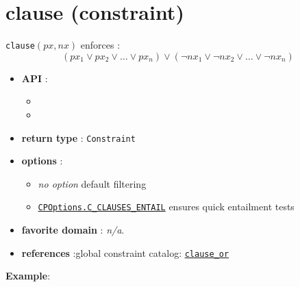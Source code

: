 \label{clause}
\hypertarget{clause}{}

\section{clause (constraint)}\label{clause:clauseconstraint}\hypertarget{clause:clauseconstraint}{}
\begin{notedef}
  \texttt{clause}$(px, nx)$ enforces :
 $$(px_1 \vee px_2 \vee \dots \vee px_n) \vee (\neg nx_1 \vee \neg nx_2 \vee \dots \vee \neg nx_n)$$  
\end{notedef}

\begin{itemize}
	\item \textbf{API} :
	\begin{itemize}
		\item {}
		\item {}
	\end{itemize}
	\item \textbf{return type} : \texttt{Constraint}
	\item \textbf{options} :
	\begin{itemize}
		\item \emph{no option} default filtering
		\item \hyperlink{cclause:cclauseoptions}{\tt CPOptions.C\_CLAUSES\_ENTAIL} ensures quick entailment tests
	\end{itemize}
	\item \textbf{favorite domain} : \emph{n/a}.
	\item \textbf{references} :global constraint catalog: \href{http://www.emn.fr/x-info/sdemasse/gccat/Cclause_or.html}{\tt clause\_or}
\end{itemize}



\textbf{Example}:

